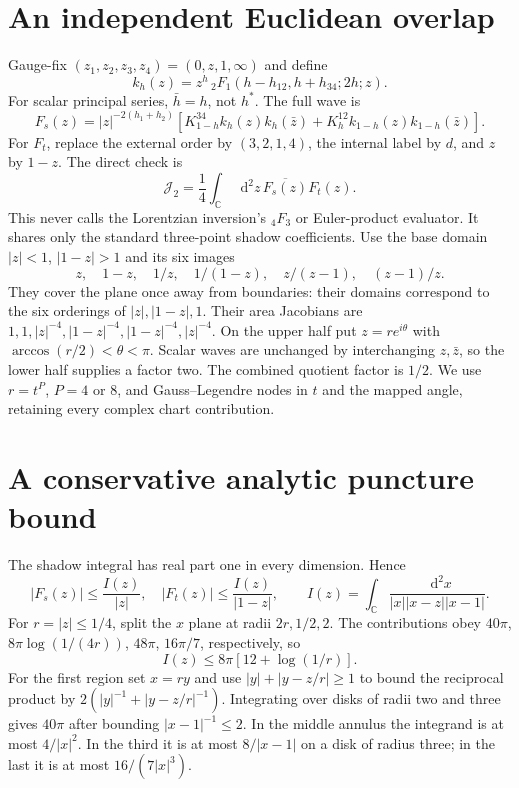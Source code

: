 \documentclass[11pt,a4paper]{article}
\newcommand{\dd}{\mathop{}\!\mathrm d}
\newcommand{\cJ}{\mathcal J}
\begin{document}
\section{An independent Euclidean overlap}
Gauge-fix $(z_1,z_2,z_3,z_4)=(0,z,1,\infty)$ and define
\[
 k_h(z)=z^h\,{}_2F_1(h-h_{12},h+h_{34};2h;z).
\]
For scalar principal series, $\bar h=h$, not $h^*$. The full wave is
\begin{equation}
 F_s(z)=|z|^{-2(h_1+h_2)}
 \left[K_{1-h}^{34} k_h(z)k_h(\bar z)
       +K_h^{12}k_{1-h}(z)k_{1-h}(\bar z)\right].
 \label{Fs}
\end{equation}
For $F_t$, replace the external order by $(3,2,1,4)$, the internal
label by $d$, and $z$ by $1-z$. The direct check is
\begin{equation}
 \cJ_2=\frac14\int_{\mathbb C}\dd^2z\,
                      \overline{F_s(z)}F_t(z).
 \label{euclidean}
\end{equation}
This never calls the Lorentzian inversion's $ {}_4F_3$ or Euler-product
evaluator. It shares only the standard three-point shadow coefficients.
Use the base domain $|z|<1$, $|1-z|>1$ and its six images
\[
 z,\quad 1-z,\quad 1/z,\quad 1/(1-z),\quad z/(z-1),\quad (z-1)/z.
\]
They cover the plane once away from boundaries: their domains correspond
to the six orderings of $|z|,|1-z|,1$. Their area Jacobians are
$1,1,|z|^{-4},|1-z|^{-4},|1-z|^{-4},|z|^{-4}$.
On the upper half put $z=r e^{i\theta}$ with
$\arccos(r/2)<\theta<\pi$. Scalar waves are unchanged by interchanging
$z,\bar z$, so the lower half supplies a factor two. The combined
quotient factor is $1/2$. We use $r=t^P$, $P=4$ or $8$, and
Gauss--Legendre nodes in $t$ and the mapped angle, retaining every
complex chart contribution.

\section{A conservative analytic puncture bound}
The shadow integral has real part one in every dimension. Hence
\[
 |F_s(z)|\le\frac{I(z)}{|z|},\quad
 |F_t(z)|\le\frac{I(z)}{|1-z|},\qquad
 I(z)=\int_{\mathbb C}\frac{\dd^2x}{|x||x-z||x-1|}.
\]
For $r=|z|\le1/4$, split the $x$ plane at radii $2r,1/2,2$.
The contributions obey
$40\pi$, $8\pi\log(1/(4r))$, $48\pi$, $16\pi/7$, respectively, so
\begin{equation}
 I(z)\le 8\pi[12+\log(1/r)].
 \label{Ibound}
\end{equation}
For the first region set $x=ry$ and use
$|y|+|y-z/r|\ge1$ to bound the reciprocal product by
$2(|y|^{-1}+|y-z/r|^{-1})$. Integrating over disks of radii two and
three gives $40\pi$ after bounding $|x-1|^{-1}\le2$.
In the middle annulus the integrand is at most $4/|x|^2$.
In the third it is at most $8/|x-1|$ on a disk of radius three;
in the last it is at most $16/(7|x|^3)$.
\end{document}

